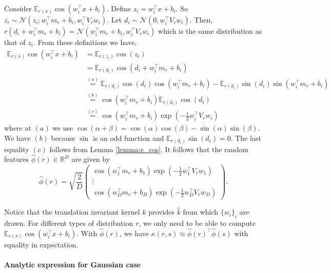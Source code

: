 \documentclass[english]{article}
\theoremstyle{plain}
\theoremstyle{plain}
\begin{document}
Consider $\mathbb{E}_{r(x)}\cos\left(w_{i}^{\top}x+b_{i}\right)$.
Define $z_{i}=w_{i}^{\top}x+b_{i}$. So $z_{i}\sim\mathcal{N}(z_{i};w_{i}^{\top}m_{r}+b_{i},w_{i}^{\top}V_{r}w_{i})$.
Let $d_{i}\sim\mathcal{N}(0,w_{i}^{\top}V_{r}w_{i})$. Then, $r(d_{i}+w_{i}^{\top}m_{r}+b_{i})=\mathcal{N}(w_{i}^{\top}m_{r}+b_{i},w_{i}^{\top}V_{r}w_{i})$
which is the same distribution as that of $z_{i}$. From these definitions
we have,
%
\begin{align*}
\mathbb{E}_{r(x)}\cos\left(w_{i}^{\top}x+b_{i}\right) & =\mathbb{E}_{r(z_{i})}\cos(z_{i})\\
 & =\mathbb{E}_{r(d_{i})}\cos\left(d_{i}+w_{i}^{\top}m_{r}+b_{i}\right)\\
 & \overset{(a)}
 {=}\mathbb{E}_{r(d_{i})}\cos(d_{i})\cos(w_{i}^{\top}m_{r}+b_{i})-\mathbb{E}_{r(d_{i})}\sin(d_{i})\sin
 (w_{i}^{\top}m_{r}+b_{i})\\
 & \overset{(b)}{=}\cos(w_{i}^{\top}m_{r}+b_{i})\mathbb{E}_{r(d_{i})}\cos(d_{i})\\
 & \overset{(c)}{=}\cos(w_{i}^{\top}m_{r}+b_{i})\exp\left(-\frac{1}{2}w_{i}^{\top}V_{r}w_{i}\right)
\end{align*}
where at $(a)$ we use $\cos(\alpha+\beta)=\cos(\alpha)\cos(\beta)-\sin(\alpha)\sin(\beta)$.
We have $(b)$ because $\sin$ is an odd function and $\mathbb{E}_{r(d_{i})}\sin(d_{i})=0$.
The last equality $(c)$ follows from Lemma \ref{lemma:e_cos}. It
follows that the random features $\hat{\phi}(r)\in\mathbb{R}^{D}$
are given by
\[
\hat{\phi}(r)=\sqrt{\frac{2}{D}}\left(\begin{array}{c}
\cos(w_{1}^{\top}m_{r}+b_{1})\exp\left(-\frac{1}{2}w_{1}^{\top}V_{r}w_{1}\right)\\
\vdots\\
\cos(w_{D}^{\top}m_{r}+b_{D})\exp\left(-\frac{1}{2}w_{D}^{\top}V_{r}w_{D}\right)
\end{array}\right).
\]


Notice that the translation invariant kernel $k$
provides $\hat{k}$ from which $\{w_{i}\}_{i}$ are
drawn. For different types of distribution $r$, we only need to
be able to compute $\mathbb{E}_{r(x)}\cos\left(w_{i}^{\top}x+b_{i}\right)$.
With $\hat{\phi}(r)$, we have $\kappa(r, s)\approx\hat{\phi}(r)^{\top}\hat{\phi}(s)$
with equality in expectation.


\paragraph{Analytic expression for Gaussian case}
\end{document}
